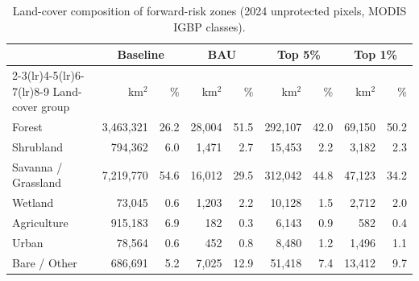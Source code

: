 \begin{table}[htbp]
  \centering
  \small
  \caption{Land-cover composition of forward-risk zones (2024 unprotected pixels, MODIS IGBP classes).}
  \label{tab:landcover_exposure}
  \begin{tabular}{lrrrrrrrr}
    \toprule
    & \multicolumn{2}{c}{Baseline} & \multicolumn{2}{c}{BAU} & \multicolumn{2}{c}{Top 5\%} & \multicolumn{2}{c}{Top 1\%} \\
    \cmidrule(lr){2-3}\cmidrule(lr){4-5}\cmidrule(lr){6-7}\cmidrule(lr){8-9}
    Land-cover group & km$^2$ & \% & km$^2$ & \% & km$^2$ & \% & km$^2$ & \% \\
    \midrule
    Forest & 3,463,321 & 26.2 & 28,004 & 51.5 & 292,107 & 42.0 & 69,150 & 50.2 \\
    Shrubland & 794,362 & 6.0 & 1,471 & 2.7 & 15,453 & 2.2 & 3,182 & 2.3 \\
    Savanna / Grassland & 7,219,770 & 54.6 & 16,012 & 29.5 & 312,042 & 44.8 & 47,123 & 34.2 \\
    Wetland & 73,045 & 0.6 & 1,203 & 2.2 & 10,128 & 1.5 & 2,712 & 2.0 \\
    Agriculture & 915,183 & 6.9 & 182 & 0.3 & 6,143 & 0.9 & 582 & 0.4 \\
    Urban & 78,564 & 0.6 & 452 & 0.8 & 8,480 & 1.2 & 1,496 & 1.1 \\
    Bare / Other & 686,691 & 5.2 & 7,025 & 12.9 & 51,418 & 7.4 & 13,412 & 9.7 \\
    \bottomrule
  \end{tabular}
\end{table}
